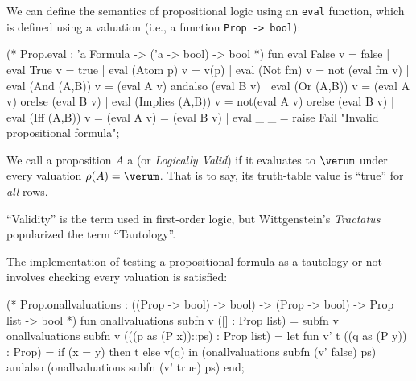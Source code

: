 \begin{node}[Semantics]
\begin{node}\label{prop:semantics-0000}%
We can define the semantics of propositional logic using an \lstinline{eval}
function, which is defined using a valuation (i.e., a function
\texttt{Prop -> bool}):

\begin{sml}
(* Prop.eval : 'a Formula -> ('a -> bool) -> bool *)
fun eval False v = false
  | eval True v = true
  | eval (Atom p) v = v(p)
  | eval (Not fm) v = not (eval fm v)
  | eval (And (A,B)) v = (eval A v) andalso (eval B v)
  | eval (Or (A,B)) v = (eval A v) orelse (eval B v)
  | eval (Implies (A,B)) v = not(eval A v) orelse (eval B v)
  | eval (Iff (A,B)) v = (eval A v) = (eval B v)
  | eval _ _ = raise Fail "Invalid propositional formula"; 
\end{sml}
\end{node}

\begin{definition}\label{prop-000L}%
We call a proposition $A$ a  (or \textit{Logically Valid})
if it evaluates to $\verum$ under every valuation $\rho(A)=\verum$.
That is to say, its truth-table value is ``true'' for \emph{all} rows.

``Validity'' is the term used in first-order logic, but Wittgenstein's
\textit{Tractatus} popularized the term ``Tautology''.
\end{definition}

\begin{node}\label{prop:semantics-0001}%
The implementation of testing a propositional formula as a tautology or
not involves checking every valuation is satisfied:

\begin{sml}
(* Prop.onallvaluations : ((Prop -> bool) -> bool)
                          -> (Prop -> bool)
                          -> Prop list
                          -> bool *)
fun onallvaluations subfn v ([] : Prop list) = subfn v
  | onallvaluations subfn v (((p as (P x))::ps) : Prop list) =
    let fun v' t ((q as (P y)) : Prop) = if (x = y) then t else v(q)
    in (onallvaluations subfn (v' false) ps) andalso
       (onallvaluations subfn (v' true) ps)
    end;


\end{sml}
\end{node}
\end{node}
